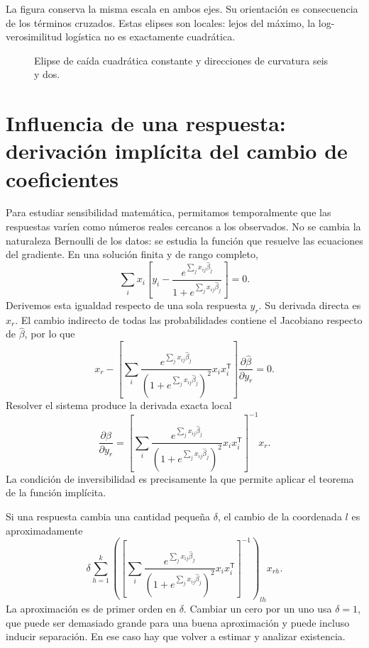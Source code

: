 \documentclass[11pt,a4paper]{article}
\newcommand{\T}{^{\mathsf T}}
\begin{document}
La figura conserva la misma escala en ambos ejes.
Su orientación es consecuencia de los términos cruzados.
Estas elipses son locales: lejos del máximo, la
log-verosimilitud logística no es exactamente cuadrática.

\begin{figure}[H]\centering
{}
\caption{Elipse de caída cuadrática constante y direcciones de curvatura seis y dos.}
\end{figure}

\clearpage
\section{Influencia de una respuesta: derivación implícita del cambio de coeficientes}\label{logit77}
Para estudiar sensibilidad matemática, permitamos temporalmente
que las respuestas varíen como números reales cercanos a los
observados. No se cambia la naturaleza Bernoulli de los datos:
se estudia la función que resuelve las ecuaciones del gradiente.
En una solución finita y de rango completo,
\[
\sum_i x_i\left[
y_i-\frac{e^{\sum_jx_{ij}\widehat\beta_j}}
{1+e^{\sum_jx_{ij}\widehat\beta_j}}\right]=0.
\]
Derivemos esta igualdad respecto de una sola respuesta \(y_r\).
Su derivada directa es \(x_r\).
El cambio indirecto de todas las probabilidades contiene
el Jacobiano respecto de \(\widehat\beta\), por lo que
\[
x_r-\left[
\sum_i\frac{e^{\sum_jx_{ij}\widehat\beta_j}}
{(1+e^{\sum_jx_{ij}\widehat\beta_j})^2}x_ix_i\T
\right]\frac{\partial\widehat\beta}{\partial y_r}=0.
\]
Resolver el sistema produce la derivada exacta local
\[
\frac{\partial\widehat\beta}{\partial y_r}
=\left[
\sum_i\frac{e^{\sum_jx_{ij}\widehat\beta_j}}
{(1+e^{\sum_jx_{ij}\widehat\beta_j})^2}x_ix_i\T
\right]^{-1}x_r.
\]
La condición de inversibilidad es precisamente la que
permite aplicar el teorema de la función implícita.

Si una respuesta cambia una cantidad pequeña \(\delta\),
el cambio de la coordenada \(l\) es aproximadamente
\[
\delta\sum_{h=1}^k
\left(\left[
\sum_i\frac{e^{\sum_jx_{ij}\widehat\beta_j}}
{(1+e^{\sum_jx_{ij}\widehat\beta_j})^2}x_ix_i\T
\right]^{-1}\right)_{lh}x_{rh}.
\]
La aproximación es de primer orden en \(\delta\).
Cambiar un cero por un uno usa \(\delta=1\),
que puede ser demasiado grande para una buena
aproximación y puede incluso inducir separación.
En ese caso hay que volver a estimar y analizar existencia.
\end{document}
